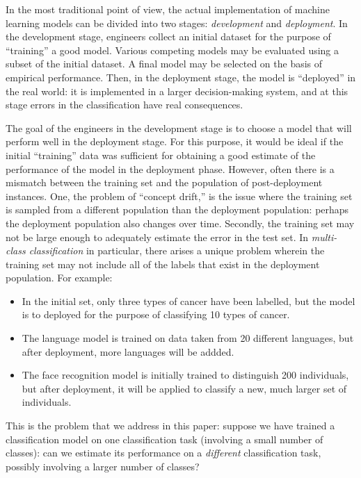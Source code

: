 \documentclass[12pt]{article}
\begin{document}
In the most traditional point of view, the actual implementation of
machine learning models can be divided into two stages:
\emph{development} and \emph{deployment}.  In the development stage,
engineers collect an initial dataset for the purpose of ``training'' a
good model.  Various competing models may be evaluated using a subset
of the initial dataset.  A final model may be selected on the basis of
empirical performance.  Then, in the deployment stage, the model is
``deployed'' in the real world: it is implemented in a larger
decision-making system, and at this stage errors in the classification
have real consequences.

The goal of the engineers in the development stage is to choose a
model that will perform well in the deployment stage.  For this
purpose, it would be ideal if the initial ``training'' data was
sufficient for obtaining a good estimate of the performance of the
model in the deployment phase.  However, often there is a mismatch
between the training set and the population of post-deployment
instances.  One, the problem of ``concept drift,'' is the issue where
the training set is sampled from a different population than the
deployment population: perhaps the deployment population also changes
over time.  Secondly, the training set may not be large enough to
adequately estimate the error in the test set.  In \emph{multi-class
  classification} in particular, there arises a unique problem wherein
the training set may not include all of the labels that exist in the
deployment population.  For example:
\begin{itemize}
\item
In the initial set, only three types of cancer have been labelled, but
the model is to deployed for the purpose of classifying 10 types of cancer.
\item
The language model is trained on data taken from 20 different
languages, but after deployment, more languages will be addded.
\item
The face recognition model is initially trained to distinguish 200
individuals, but after deployment, it will be applied to classify a
new, much larger set of individuals.
\end{itemize}

This is the problem that we address in this paper: suppose we have
trained a classification model on one classification task (involving a
small number of classes): can we estimate its performance on a
\emph{different} classification task, possibly involving a larger
number of classes?
\end{document}
